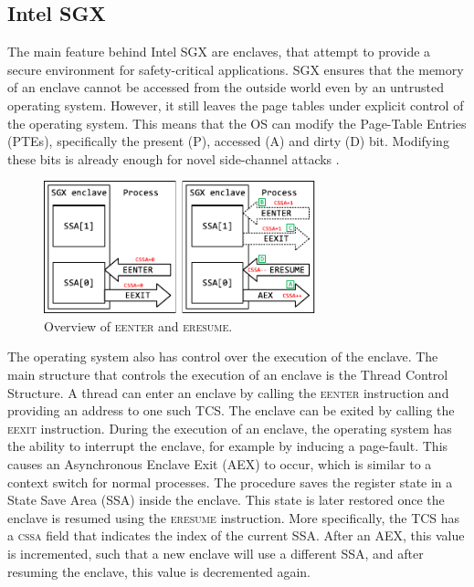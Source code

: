\documentclass{llncs}
\begin{document}
\subsection{Intel SGX}

The main feature behind Intel SGX are enclaves,
that attempt to provide a secure environment for safety-critical applications.
SGX ensures that the memory of an enclave cannot be accessed from the outside world
even by an untrusted operating system.
However, it still leaves the page tables under explicit control of the operating system.
This means that the OS can modify the Page-Table Entries (PTEs),
specifically the present (P), accessed (A) and dirty (D) bit.
Modifying these bits is already enough for novel side-channel attacks \cite{XuCP15,BulckWKPS17}.

\begin{figure}
  \centering
  \includegraphics[width=0.7\textwidth]{images/sgx-ssa.pdf}
  \caption{Overview of \textsc{eenter} and \textsc{eresume}.}
  \label{fig:sgx-ssa}
\end{figure}

The operating system also has control over the execution of the enclave.
The main structure that controls the execution of an enclave is the Thread Control Structure.
A thread can enter an enclave by calling the \textsc{eenter} instruction and providing an address to one such TCS.
The enclave can be exited by calling the \textsc{eexit} instruction.
During the execution of an enclave,
the operating system has the ability to interrupt the enclave,
for example by inducing a page-fault.
This causes an Asynchronous Enclave Exit (AEX) to occur,
which is similar to a context switch for normal processes.
The procedure saves the register state in a State Save Area (SSA) inside the enclave.
This state is later restored once the enclave is resumed using the \textsc{eresume} instruction.
More specifically, the TCS has a \textsc{cssa} field that indicates the index of the current SSA.
After an AEX, this value is incremented, such that a new enclave will use a different SSA,
and after resuming the enclave, this value is decremented again.
\end{document}
